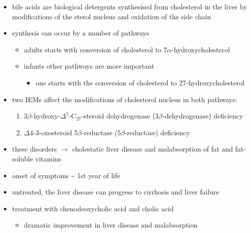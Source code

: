 \documentclass{scrartcl}
\begin{document}
\begin{itemize}
\item bile acids are biological detergents synthesised from cholesterol
in the liver by modifications of the sterol nucleus and oxidation of
the side chain
\item synthesis can occur by a number of pathways
\begin{itemize}
\item adults starts with conversion of cholesterol to 7\(\alpha\)-hydroxycholesterol
\item infants other pathways are more important
\begin{itemize}
\item one starts with the conversion of cholesterol to 27-hydroxycholesterol
\end{itemize}
\end{itemize}
\item two IEMs affect the modifications of cholesterol nucleus in both pathways:
\begin{enumerate}
\item 3\(\beta\)-hydroxy-\(\Delta^{\text{5}}\)-C\(_{\text{27}}\)-steroid dehydrogenase (3\(\beta\)-dehydrogenase) deficiency
\item \(\Delta\)4-3-oxosteroid 5\(\beta\)-reductase (5\(\beta\)-reductase) deficiency
\end{enumerate}
\item these disorders \(\to\) cholestatic liver disease and malabsorption of
fat and fat-soluble vitamins
\item onset of symptoms \textasciitilde{} 1st year of life
\item untreated, the liver disease can progress to cirrhosis and liver failure
\item treatment with chenodeoxycholic acid and cholic acid
\begin{itemize}
\item dramatic improvement in liver disease and malabsorption
\end{itemize}


\end{itemize}
\end{document}
